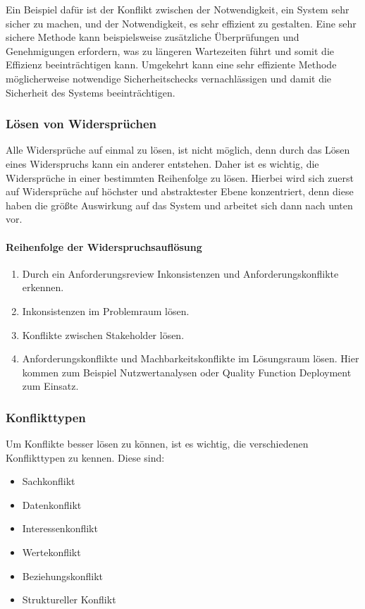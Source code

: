 Ein Beispiel dafür ist der Konflikt zwischen der Notwendigkeit, ein System sehr sicher zu machen,
und der Notwendigkeit, es sehr effizient zu gestalten.
Eine sehr sichere Methode kann beispielsweise zusätzliche Überprüfungen und Genehmigungen erfordern,
was zu längeren Wartezeiten führt und somit die Effizienz beeinträchtigen kann.
Umgekehrt kann eine sehr effiziente Methode möglicherweise notwendige Sicherheitschecks vernachlässigen
und damit die Sicherheit des Systems beeinträchtigen.\autocite[vgl.][S.236]{Herrmann.2022}

\subsubsection{Lösen von Widersprüchen}\label{subsubsec:loesen}
Alle Widersprüche auf einmal zu lösen, ist nicht möglich,
denn durch das Lösen eines Widerspruchs kann ein anderer entstehen.
Daher ist es wichtig, die Widersprüche in einer bestimmten Reihenfolge zu lösen.
Hierbei wird sich zuerst auf Widersprüche auf höchster und abstraktester Ebene konzentriert,
denn diese haben die größte Auswirkung auf das System und arbeitet sich dann nach unten vor.

\paragraph{Reihenfolge der Widerspruchsauflösung}
\begin{enumerate}
    \item Durch ein Anforderungsreview Inkonsistenzen und Anforderungskonflikte erkennen.
    \item Inkonsistenzen im Problemraum lösen.
    \item Konflikte zwischen Stakeholder lösen.
    \item Anforderungskonflikte und Machbarkeitskonflikte im Lösungsraum lösen.
    Hier kommen zum Beispiel Nutzwertanalysen oder Quality Function Deployment zum Einsatz.
\end{enumerate}\autocite[vgl.][S.237f]{Herrmann.2022}

\subsubsection{Konflikttypen}
Um Konflikte besser lösen zu können, ist es wichtig, die verschiedenen Konflikttypen zu kennen.
Diese sind:
\begin{itemize}
    \item Sachkonflikt
    \item Datenkonflikt
    \item Interessenkonflikt
    \item Wertekonflikt
    \item Beziehungskonflikt
    \item Struktureller Konflikt
\end{itemize}\autocite[vgl.][S.137]{Pohl.2021}


